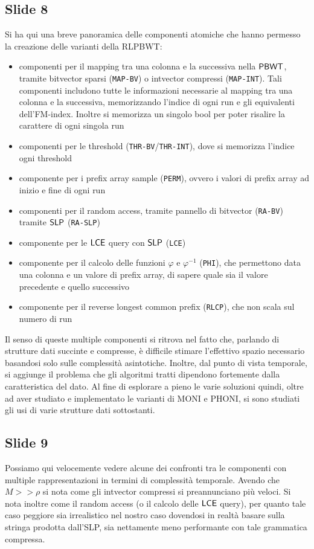 \documentclass[a4paper,11pt, oneside,italian]{article}
\def\SLP{\mbox{\rm {\sf SLP}}}
\def\LCE{\mbox{\rm {\sf LCE}}}
\def\PBWT{\mbox{\rm {\sf PBWT}}}
\def\LCE{\mbox{\rm {\sf LCE}}}
\begin{document}
\subsection*{Slide 8}
Si ha qui una breve panoramica delle componenti atomiche che hanno permesso la
creazione delle varianti della RLPBWT:
\begin{itemize}
  \item componenti per il mapping tra una colonna e la successiva nella
  $\PBWT$, tramite bitvector sparsi (\texttt{MAP-BV}) o intvector compressi
  (\texttt{MAP-INT}). Tali componenti includono tutte le informazioni necessarie
  al mapping tra una colonna e la successiva, memorizzando l'indice di ogni run
  e gli 
  equivalenti dell'FM-index. Inoltre si memorizza un singolo bool per poter
  risalire la carattere di ogni singola run
  \item componenti per le threshold (\texttt{THR-BV}/\texttt{THR-INT}), dove si
  memorizza l'indice ogni threshold
  \item componente per i prefix array sample (\texttt{PERM}), ovvero i valori di
  prefix array ad inizio e fine di ogni run
  \item componenti per il random access, tramite pannello di bitvector
  (\texttt{RA-BV}) tramite $\SLP$ (\texttt{RA-SLP})
  \item componente per le $\LCE$ query con $\SLP$ (\texttt{LCE})
  \item componente per il calcolo delle funzioni $\varphi$ e $\varphi^{-1}$
  (\texttt{PHI}), che permettono data una colonna e un valore di prefix array,
  di sapere quale sia il valore precedente e quello successivo
  \item componente per il reverse longest common prefix (\texttt{RLCP}), che non
  scala sul numero di run
\end{itemize}
Il senso di queste multiple componenti si ritrova nel fatto che, parlando di
strutture dati succinte e compresse, è difficile stimare l'effettivo spazio
necessario basandosi solo sulle complessità asintotiche. Inoltre, dal punto di
vista temporale, si aggiunge il problema che gli algoritmi tratti dipendono
fortemente dalla caratteristica del dato. Al fine di esplorare a pieno le varie
soluzioni quindi, oltre ad aver studiato e implementato le varianti di MONI e
PHONI, si sono studiati gli usi di varie strutture dati sottostanti.
\subsection*{Slide 9}
Possiamo qui velocemente vedere alcune dei confronti tra le componenti con
multiple rappresentazioni in termini di complessità temporale. Avendo che
$M>>\rho$ si nota come gli intvector compressi si preannunciano più veloci.
Si nota inoltre come il random access (o il calcolo delle $\LCE$ query), per
quanto tale caso peggiore sia irrealistico nel nostro caso dovendosi in realtà
basare sulla stringa prodotta dall'SLP, sia nettamente meno performante con tale
grammatica compressa.
\end{document}
